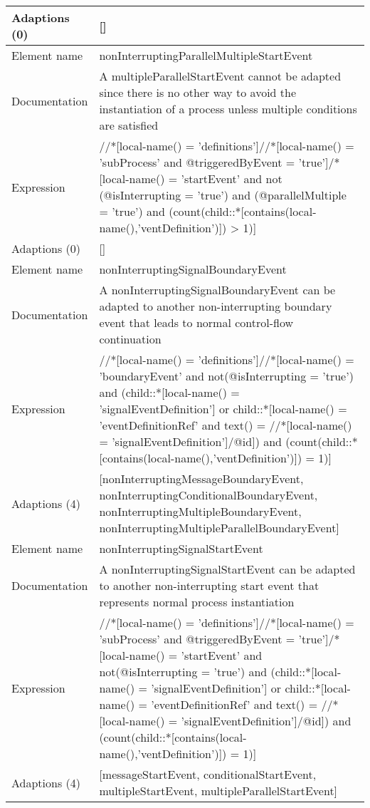 \begin{center}
\begin{tiny}
\begin{longtable}{p{}|p{}}
\myrowcolour
Adaptions (0) & []\\
\midrule
Element name & nonInterruptingParallelMultipleStartEvent\\
\myrowcolour
Documentation &A multipleParallelStartEvent cannot be adapted since there is no other way to avoid the instantiation of a process unless multiple conditions are satisfied\\
Expression & //*[local-name() = 'definitions']//*[local-name() = 'subProcess' and @triggeredByEvent = 'true']/*[local-name() = 'startEvent' and not (@isInterrupting = 'true') and (@parallelMultiple = 'true') and (count(child::*[contains(local-name(),'ventDefinition')]) > 1)]\\
\myrowcolour
Adaptions (0) & []\\
\midrule
Element name & nonInterruptingSignalBoundaryEvent\\
\myrowcolour
Documentation &A nonInterruptingSignalBoundaryEvent can be adapted to another non-interrupting boundary event that leads to normal control-flow continuation\\
Expression & //*[local-name() = 'definitions']//*[local-name() = 'boundaryEvent' and not(@isInterrupting = 'true') and (child::*[local-name() = 'signalEventDefinition'] or child::*[local-name() = 'eventDefinitionRef' and text() = //*[local-name() = 'signalEventDefinition']/@id]) and (count(child::*[contains(local-name(),'ventDefinition')]) = 1)]\\
\myrowcolour
Adaptions (4) & [nonInterruptingMessageBoundaryEvent, nonInterruptingConditionalBoundaryEvent, nonInterruptingMultipleBoundaryEvent, nonInterruptingMultipleParallelBoundaryEvent]\\
\midrule
Element name & nonInterruptingSignalStartEvent\\
\myrowcolour
Documentation &A nonInterruptingSignalStartEvent can be adapted to another non-interrupting start event that represents normal process instantiation\\
Expression & //*[local-name() = 'definitions']//*[local-name() = 'subProcess' and @triggeredByEvent = 'true']/*[local-name() = 'startEvent' and not(@isInterrupting = 'true') and (child::*[local-name() = 'signalEventDefinition'] or child::*[local-name() = 'eventDefinitionRef' and text() = //*[local-name() = 'signalEventDefinition']/@id]) and (count(child::*[contains(local-name(),'ventDefinition')]) = 1)]\\
\myrowcolour
Adaptions (4) & [messageStartEvent, conditionalStartEvent, multipleStartEvent, multipleParallelStartEvent]\\

\end{longtable}
\end{tiny}
\end{center}
